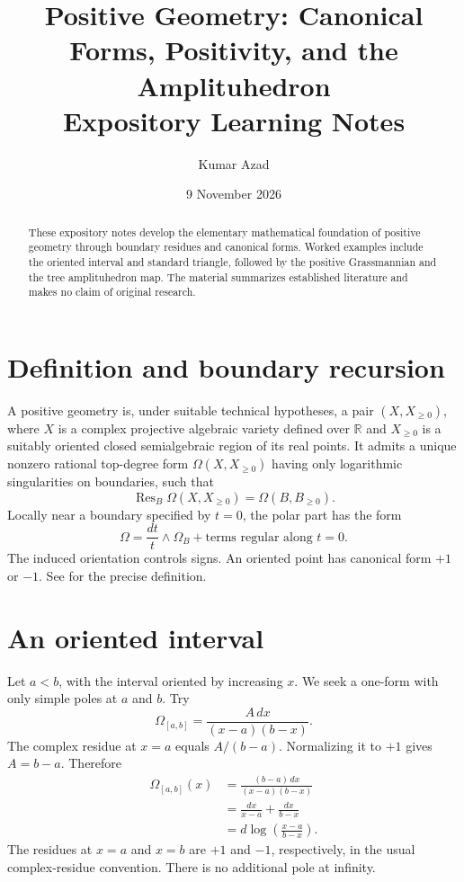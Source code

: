 \documentclass[11pt,a4paper]{article}
\title{Positive Geometry: Canonical Forms, Positivity, and the Amplituhedron\\[4pt]\large Expository Learning Notes}
\author{Kumar Azad}
\date{9 November 2026}
\newcommand{\Res}{\operatorname{Res}}
\begin{document}
\maketitle
\begin{abstract}
These expository notes develop the elementary mathematical foundation
of positive geometry through boundary residues and canonical forms.
Worked examples include the oriented interval and standard triangle,
followed by the positive Grassmannian and the tree amplituhedron map.
The material summarizes established literature and makes no claim of
original research.
\end{abstract}
\tableofcontents

\section{Definition and boundary recursion}
A positive geometry is, under suitable technical hypotheses,
a pair $(X,X_{\geq0})$, where $X$ is a complex projective
algebraic variety defined over $\mathbb R$ and $X_{\geq0}$
is a suitably oriented closed semialgebraic region of its real points.
It admits a unique nonzero rational top-degree form $\Omega(X,X_{\geq0})$
having only logarithmic singularities on boundaries, such that
\begin{equation}
\boxed{\Res_{B}\Omega(X,X_{\geq0})=\Omega(B,B_{\geq0}).}
\label{eq:recursion}
\end{equation}
Locally near a boundary specified by $t=0$, the polar part has the form
\begin{equation}
\Omega=\frac{dt}{t}\wedge\Omega_B+
\text{terms regular along }t=0.
\end{equation}
The induced orientation controls signs. An oriented point has
canonical form $+1$ or $-1$. See \cite{ABL} for the precise definition.

\section{An oriented interval}
Let $a<b$, with the interval oriented by increasing $x$.
We seek a one-form with only simple poles at $a$ and $b$.
Try
\begin{equation}
\Omega_{[a,b]}=\frac{A\,dx}{(x-a)(b-x)}.
\end{equation}
The complex residue at $x=a$ equals $A/(b-a)$.
Normalizing it to $+1$ gives $A=b-a$. Therefore
\begin{equation}
\begin{aligned}
\boxed{\Omega_{[a,b]}(x)}
&=\frac{(b-a)\,dx}{(x-a)(b-x)}\\
&=\frac{dx}{x-a}+\frac{dx}{b-x}\\
&=d\log\left(\frac{x-a}{b-x}\right).
\end{aligned}
\label{eq:interval}
\end{equation}
The residues at $x=a$ and $x=b$ are $+1$ and $-1$,
respectively, in the usual complex-residue convention.
There is no additional pole at infinity.
\end{document}
